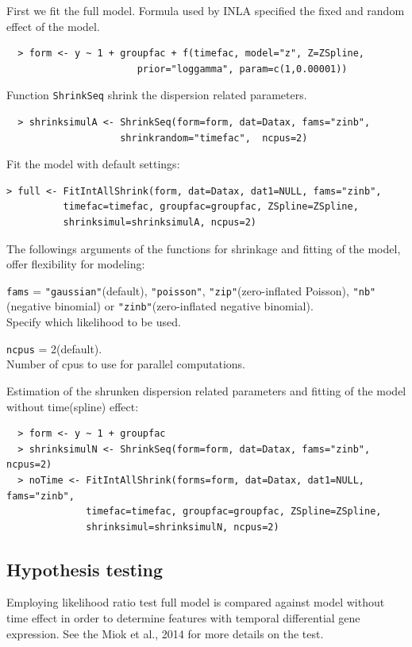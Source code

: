 \documentclass[a4paper]{article}
\begin{document}
First we fit the full model. Formula used by INLA specified the fixed and random effect of the model.
\begin{verbatim}
  > form <- y ~ 1 + groupfac + f(timefac, model="z", Z=ZSpline,
                       prior="loggamma", param=c(1,0.00001))
\end{verbatim}
Function {\tt ShrinkSeq} shrink the dispersion related parameters.
\begin{verbatim}
  > shrinksimulA <- ShrinkSeq(form=form, dat=Datax, fams="zinb",
                    shrinkrandom="timefac",  ncpus=2)
\end{verbatim}  
Fit the model with default settings:

\begin{verbatim}  
> full <- FitIntAllShrink(form, dat=Datax, dat1=NULL, fams="zinb",
          timefac=timefac, groupfac=groupfac, ZSpline=ZSpline,
          shrinksimul=shrinksimulA, ncpus=2)
\end{verbatim}  
The followings arguments of the functions for shrinkage and fitting of the model, offer flexibility for modeling:
\begin{compactitem}
\item {\tt fams} =  {\tt "gaussian"}(default), {\tt "poisson"}, {\tt "zip"}(zero-inflated Poisson), {\tt "nb"}(negative binomial) or {\tt "zinb"}(zero-inflated negative binomial).\\
 Specify which likelihood to be used. 
\item {\tt ncpus} = 2(default).\\
 Number of cpus to use for parallel computations. 

\end{compactitem}


Estimation of the shrunken dispersion related parameters and fitting of the model without time(spline) effect:
\begin{verbatim}
  > form <- y ~ 1 + groupfac
  > shrinksimulN <- ShrinkSeq(form=form, dat=Datax, fams="zinb", ncpus=2)
  > noTime <- FitIntAllShrink(forms=form, dat=Datax, dat1=NULL, fams="zinb",
              timefac=timefac, groupfac=groupfac, ZSpline=ZSpline,
              shrinksimul=shrinksimulN, ncpus=2)
\end{verbatim}

\subsection{Hypothesis testing}

Employing likelihood ratio test full model is compared against model without time effect in order to determine features with temporal differential gene expression. See the Miok et al., 2014 for more details on the test.
\end{document}
